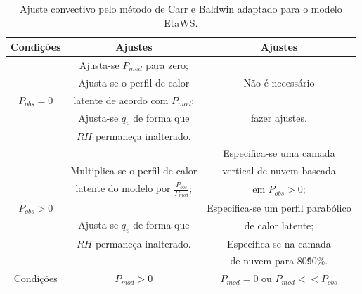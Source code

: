 \begin{table}
\caption{Ajuste convectivo pelo método de Carr e Baldwin adaptado para o modelo EtaWS.}
\label{tab02}
\centering
\begin{tabular}{c|c|c}
\hline
Condições & Ajustes                    & Ajustes                                    \\
\hline
            & Ajusta-se $P_{mod}$ para zero;   &                                            \\
            & Ajusta-se o perfil de calor      & Não é necessário               \\
$P_{obs}=0$ & latente de acordo com $P_{mod}$; &                                            \\
            & Ajusta-se $q_{v}$ de forma que   & fazer ajustes.                             \\
            & $RH$ permaneça inalterado.   &                                            \\
\hline
            &                                  & Especifica-se uma camada                   \\
            & Multiplica-se o perfil de calor  & vertical de nuvem baseada  \\
            & latente do modelo por $\frac{P_{obs}}{P_{mod}}$; & em $P_{obs}>0$;            \\
$P_{obs}>0$ &                                  & Especifica-se um perfil parabólico     \\
            & Ajusta-se $q_{v}$ de forma que   & de calor latente;                          \\
            &  $RH$ permaneça inalterado.  & Especifica-se  na camada                   \\ 
            &                                  & de nuvem para 80\~90\%.                     \\
\hline
Condições &        $P_{mod}>0$               & $P_{mod}=0$ ou $P_{mod}<<P_{obs}$    \\
\hline
\end{tabular}
\end{table}

